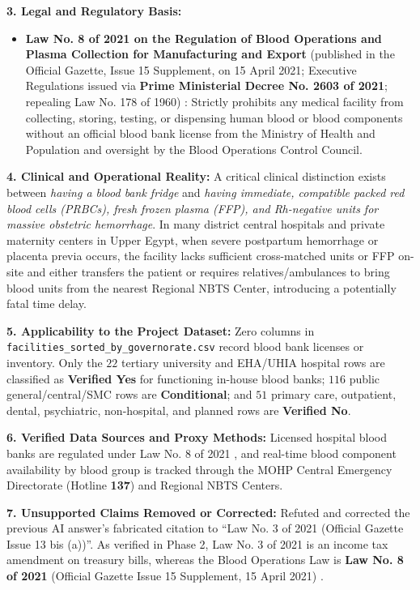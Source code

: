 \documentclass[10pt,a4paper]{article}
\begin{document}
\textbf{3. Legal and Regulatory Basis:}
\begin{itemize}
    \item \textbf{Law No. 8 of 2021 on the Regulation of Blood Operations and Plasma Collection for Manufacturing and Export} (published in the Official Gazette, Issue 15 Supplement, on 15 April 2021; Executive Regulations issued via \textbf{Prime Ministerial Decree No. 2603 of 2021}; repealing Law No. 178 of 1960) \cite{egypt_law_8_2021_blood}: Strictly prohibits any medical facility from collecting, storing, testing, or dispensing human blood or blood components without an official blood bank license from the Ministry of Health and Population and oversight by the Blood Operations Control Council.
\end{itemize}

\textbf{4. Clinical and Operational Reality:}
A critical clinical distinction exists between \textit{having a blood bank fridge} and \textit{having immediate, compatible packed red blood cells (PRBCs), fresh frozen plasma (FFP), and Rh-negative units for massive obstetric hemorrhage}. In many district central hospitals and private maternity centers in Upper Egypt, when severe postpartum hemorrhage or placenta previa occurs, the facility lacks sufficient cross-matched units or FFP on-site and either transfers the patient or requires relatives/ambulances to bring blood units from the nearest Regional NBTS Center, introducing a potentially fatal time delay.

\textbf{5. Applicability to the Project Dataset:}
Zero columns in \texttt{facilities\_sorted\_by\_governorate.csv} record blood bank licenses or inventory. Only the $22$ tertiary university and EHA/UHIA hospital rows are classified as \textbf{Verified Yes} for functioning in-house blood banks; $116$ public general/central/SMC rows are \textbf{Conditional}; and $51$ primary care, outpatient, dental, psychiatric, non-hospital, and planned rows are \textbf{Verified No}.

\textbf{6. Verified Data Sources and Proxy Methods:}
Licensed hospital blood banks are regulated under Law No. 8 of 2021 \cite{egypt_law_8_2021_blood}, and real-time blood component availability by blood group is tracked through the MOHP Central Emergency Directorate (Hotline \textbf{137}) and Regional NBTS Centers.

\textbf{7. Unsupported Claims Removed or Corrected:}
Refuted and corrected the previous AI answer's fabricated citation to ``Law No. 3 of 2021 (Official Gazette Issue 13 bis (a))''. As verified in Phase 2, Law No. 3 of 2021 is an income tax amendment on treasury bills, whereas the Blood Operations Law is \textbf{Law No. 8 of 2021} (Official Gazette Issue 15 Supplement, 15 April 2021) \cite{egypt_law_8_2021_blood}.
\end{document}

